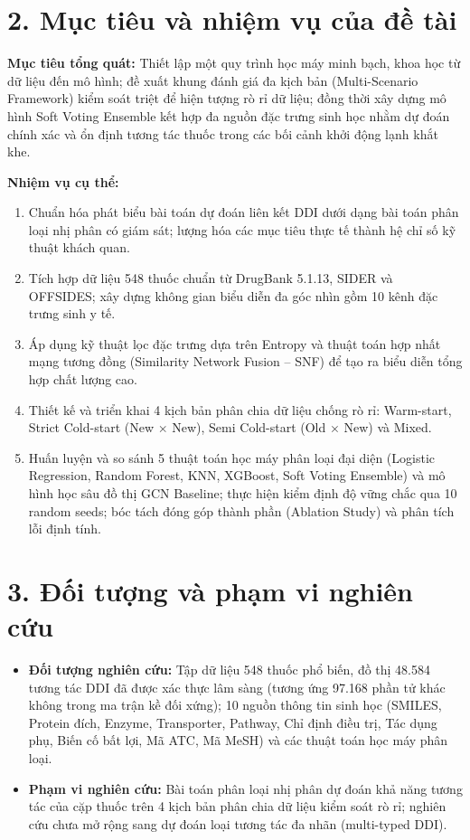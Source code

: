 \documentclass[12pt,a4paper,oneside]{report}
\begin{document}
\section*{2. Mục tiêu và nhiệm vụ của đề tài}
\textbf{Mục tiêu tổng quát:} Thiết lập một quy trình học máy minh bạch, khoa học từ dữ liệu đến mô hình; đề xuất khung đánh giá đa kịch bản (Multi-Scenario Framework) kiểm soát triệt để hiện tượng rò rỉ dữ liệu; đồng thời xây dựng mô hình Soft Voting Ensemble kết hợp đa nguồn đặc trưng sinh học nhằm dự đoán chính xác và ổn định tương tác thuốc trong các bối cảnh khởi động lạnh khắt khe.

\textbf{Nhiệm vụ cụ thể:}
\begin{enumerate}[label=\alph*)]
  \item Chuẩn hóa phát biểu bài toán dự đoán liên kết DDI dưới dạng bài toán phân loại nhị phân có giám sát; lượng hóa các mục tiêu thực tế thành hệ chỉ số kỹ thuật khách quan.
  \item Tích hợp dữ liệu 548 thuốc chuẩn từ DrugBank 5.1.13, SIDER và OFFSIDES; xây dựng không gian biểu diễn đa góc nhìn gồm 10 kênh đặc trưng sinh y tế.
  \item Áp dụng kỹ thuật lọc đặc trưng dựa trên Entropy và thuật toán hợp nhất mạng tương đồng (Similarity Network Fusion -- SNF) để tạo ra biểu diễn tổng hợp chất lượng cao.
  \item Thiết kế và triển khai 4 kịch bản phân chia dữ liệu chống rò rỉ: Warm-start, Strict Cold-start (New $\times$ New), Semi Cold-start (Old $\times$ New) và Mixed.
  \item Huấn luyện và so sánh 5 thuật toán học máy phân loại đại diện (Logistic Regression, Random Forest, KNN, XGBoost, Soft Voting Ensemble) và mô hình học sâu đồ thị GCN Baseline; thực hiện kiểm định độ vững chắc qua 10 random seeds; bóc tách đóng góp thành phần (Ablation Study) và phân tích lỗi định tính.
\end{enumerate}

\section*{3. Đối tượng và phạm vi nghiên cứu}
\begin{itemize}
  \item \textbf{Đối tượng nghiên cứu:} Tập dữ liệu 548 thuốc phổ biến, đồ thị 48.584 tương tác DDI đã được xác thực lâm sàng (tương ứng 97.168 phần tử khác không trong ma trận kề đối xứng); 10 nguồn thông tin sinh học (SMILES, Protein đích, Enzyme, Transporter, Pathway, Chỉ định điều trị, Tác dụng phụ, Biến cố bất lợi, Mã ATC, Mã MeSH) và các thuật toán học máy phân loại.
  \item \textbf{Phạm vi nghiên cứu:} Bài toán phân loại nhị phân dự đoán khả năng tương tác của cặp thuốc trên 4 kịch bản phân chia dữ liệu kiểm soát rò rỉ; nghiên cứu chưa mở rộng sang dự đoán loại tương tác đa nhãn (multi-typed DDI).
\end{itemize}
\end{document}
